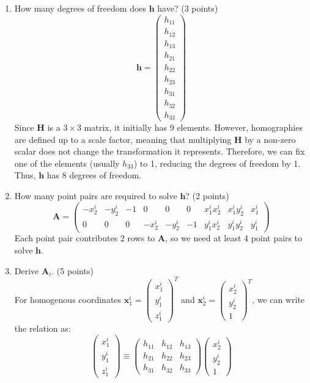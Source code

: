 \documentclass[a3paper,12pt]{extarticle} %
\begin{document}
    \begin{enumerate}
        \item How many degrees of freedom does $\mathbf{h}$ have? (3 points)
        \[
        \mathbf{h} = \begin{pmatrix} h_{11} \\ h_{12} \\ h_{13} \\ h_{21} \\ h_{22} \\ h_{23} \\ h_{31} \\ h_{32} \\ h_{33} \end{pmatrix}
        \]
        Since $\mathbf{H}$ is a $3 \times 3$ matrix, it initially has 9 elements. However, homographies are defined up to a scale factor, meaning that multiplying $\mathbf{H}$ by a non-zero scalar does not change the transformation it represents. Therefore, we can fix one of the elements (usually $h_{33}$) to 1, reducing the degrees of freedom by 1. Thus, $\mathbf{h}$ has 8 degrees of freedom.
        \item How many point pairs are required to solve $\mathbf{h}$? (2 points)
        \[
        \mathbf{A} = \begin{pmatrix}
        -x_2^i & -y_2^i & -1 & 0 & 0 & 0 & x_1^i x_2^i & x_1^i y_2^i & x_1^i \\
        0 & 0 & 0 & -x_2^i & -y_2^i & -1 & y_1^i x_2^i & y_1^i y_2^i & y_1^i
        \end{pmatrix}
        \]
        Each point pair contributes 2 rows to $\mathbf{A}$, so we need at least 4 point pairs to solve $\mathbf{h}$.
        \item Derive $\mathbf{A}_i$. (5 points)
        \\ For homogenous coordinates $\mathbf{x}_1^i = \begin{pmatrix} x_1^i \\ y_1^i \\ z_1^i \end{pmatrix}^T$ and $\mathbf{x}_2^i = \begin{pmatrix} x_2^i \\ y_2^i \\ 1 \end{pmatrix}^T$, we can write the relation as:
        \[
        \begin{pmatrix} x_1^i \\ y_1^i \\ z_1^i \end{pmatrix} \equiv \begin{pmatrix} h_{11} & h_{12} & h_{13} \\ h_{21} & h_{22} & h_{23} \\ h_{31} & h_{32} & h_{33} \end{pmatrix} \begin{pmatrix} x_2^i \\ y_2^i \\ 1 \end{pmatrix}
\]
\end{enumerate}
\end{document}
